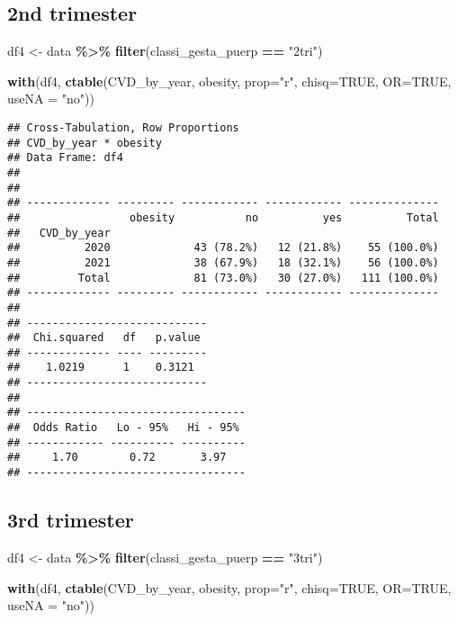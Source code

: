 \documentclass[
]{article}
\newenvironment{Shaded}{\begin{snugshade}}{\end{snugshade}}
\newcommand{\AttributeTok}[1]{\textcolor[rgb]{0.13,0.29,0.53}{#1}}
\newcommand{\ConstantTok}[1]{\textcolor[rgb]{0.56,0.35,0.01}{#1}}
\newcommand{\FunctionTok}[1]{\textcolor[rgb]{0.13,0.29,0.53}{\textbf{#1}}}
\newcommand{\NormalTok}[1]{#1}
\newcommand{\OtherTok}[1]{\textcolor[rgb]{0.56,0.35,0.01}{#1}}
\newcommand{\SpecialCharTok}[1]{\textcolor[rgb]{0.81,0.36,0.00}{\textbf{#1}}}
\newcommand{\StringTok}[1]{\textcolor[rgb]{0.31,0.60,0.02}{#1}}
\begin{document}
\hypertarget{nd-trimester-5}{%
\subsection{2nd trimester}\label{nd-trimester-5}}

\begin{Shaded}
\begin{Highlighting}[]
\NormalTok{df4 }\OtherTok{\textless{}{-}}\NormalTok{ data }\SpecialCharTok{\%\textgreater{}\%} 
  \FunctionTok{filter}\NormalTok{(classi\_gesta\_puerp }\SpecialCharTok{==} \StringTok{"2tri"}\NormalTok{)}

\FunctionTok{with}\NormalTok{(df4, }\FunctionTok{ctable}\NormalTok{(CVD\_by\_year, obesity, }\AttributeTok{prop=}\StringTok{"r"}\NormalTok{, }\AttributeTok{chisq=}\ConstantTok{TRUE}\NormalTok{, }\AttributeTok{OR=}\ConstantTok{TRUE}\NormalTok{, }\AttributeTok{useNA =} \StringTok{"no"}\NormalTok{))}
\end{Highlighting}
\end{Shaded}

\begin{verbatim}
## Cross-Tabulation, Row Proportions  
## CVD_by_year * obesity  
## Data Frame: df4  
## 
## 
## ------------- --------- ------------ ------------ --------------
##                 obesity           no          yes          Total
##   CVD_by_year                                                   
##          2020             43 (78.2%)   12 (21.8%)    55 (100.0%)
##          2021             38 (67.9%)   18 (32.1%)    56 (100.0%)
##         Total             81 (73.0%)   30 (27.0%)   111 (100.0%)
## ------------- --------- ------------ ------------ --------------
## 
## ----------------------------
##  Chi.squared   df   p.value 
## ------------- ---- ---------
##    1.0219      1    0.3121  
## ----------------------------
## 
## ----------------------------------
##  Odds Ratio   Lo - 95%   Hi - 95% 
## ------------ ---------- ----------
##     1.70        0.72       3.97   
## ----------------------------------
\end{verbatim}

\hypertarget{rd-trimester-5}{%
\subsection{3rd trimester}\label{rd-trimester-5}}

\begin{Shaded}
\begin{Highlighting}[]
\NormalTok{df4 }\OtherTok{\textless{}{-}}\NormalTok{ data }\SpecialCharTok{\%\textgreater{}\%} 
  \FunctionTok{filter}\NormalTok{(classi\_gesta\_puerp }\SpecialCharTok{==} \StringTok{"3tri"}\NormalTok{)}

\FunctionTok{with}\NormalTok{(df4, }\FunctionTok{ctable}\NormalTok{(CVD\_by\_year, obesity, }\AttributeTok{prop=}\StringTok{"r"}\NormalTok{, }\AttributeTok{chisq=}\ConstantTok{TRUE}\NormalTok{, }\AttributeTok{OR=}\ConstantTok{TRUE}\NormalTok{, }\AttributeTok{useNA =} \StringTok{"no"}\NormalTok{))}
\end{Highlighting}
\end{Shaded}
\end{document}
